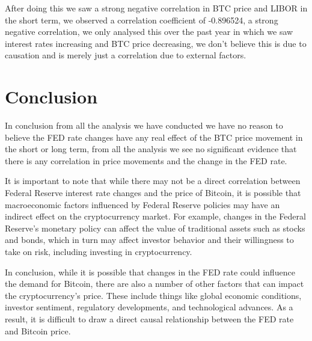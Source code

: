 \documentclass[12pt]{article}
\begin{document}
After doing this we saw a strong negative correlation in BTC price and LIBOR in the short term, we observed a correlation coefficient of -0.896524, a strong negative correlation, we only analysed this over the past year in which we saw interest rates increasing and BTC price decreasing, we don't believe this is due to causation and is merely just a correlation due to external factors.
\section{Conclusion}
In conclusion from all the analysis we have conducted we have no reason to believe the FED rate changes have any real effect of the BTC price movement in the short or long term, from all the analysis we see no significant evidence that there is any correlation in price movements and the change in the FED rate.

It is important to note that while there may not be a direct correlation between Federal Reserve interest rate changes and the price of Bitcoin, it is possible that macroeconomic factors influenced by Federal Reserve policies may have an indirect effect on the cryptocurrency market. For example, changes in the Federal Reserve's monetary policy can affect the value of traditional assets such as stocks and bonds, which in turn may affect investor behavior and their willingness to take on risk, including investing in cryptocurrency.


In conclusion, while it is possible that changes in the FED rate could influence the demand for Bitcoin, there are also a number of other factors that can impact the cryptocurrency's price. These include things like global economic conditions, investor sentiment, regulatory developments, and technological advances. As a result, it is difficult to draw a direct causal relationship between the FED rate and Bitcoin price.
\end{document}

